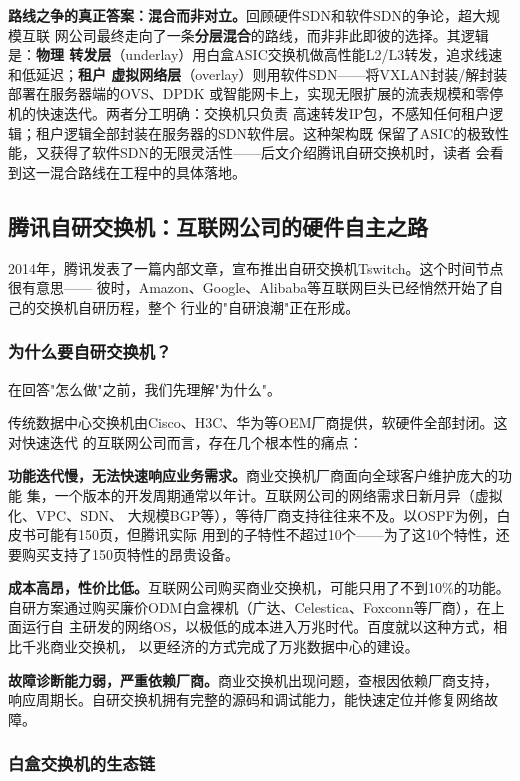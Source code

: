 \textbf{路线之争的真正答案：混合而非对立。}回顾硬件SDN和软件SDN的争论，超大规模互联
网公司最终走向了一条\textbf{分层混合}的路线，而非非此即彼的选择。其逻辑是：\textbf{物理
转发层}（underlay）用白盒ASIC交换机做高性能L2/L3转发，追求线速和低延迟；\textbf{租户
虚拟网络层}（overlay）则用软件SDN——将VXLAN封装/解封装部署在服务器端的OVS、DPDK
或智能网卡上，实现无限扩展的流表规模和零停机的快速迭代。两者分工明确：交换机只负责
高速转发IP包，不感知任何租户逻辑；租户逻辑全部封装在服务器的SDN软件层。这种架构既
保留了ASIC的极致性能，又获得了软件SDN的无限灵活性——后文介绍腾讯自研交换机时，读者
会看到这一混合路线在工程中的具体落地。

\subsection{腾讯自研交换机：互联网公司的硬件自主之路}

2014年，腾讯发表了一篇内部文章，宣布推出自研交换机Tswitch。这个时间节点很有意思——
彼时，Amazon、Google、Alibaba等互联网巨头已经悄然开始了自己的交换机自研历程，整个
行业的"自研浪潮"正在形成。

\subsubsection{为什么要自研交换机？}

在回答"怎么做"之前，我们先理解"为什么"。

传统数据中心交换机由Cisco、H3C、华为等OEM厂商提供，软硬件全部封闭。这对快速迭代
的互联网公司而言，存在几个根本性的痛点：

\textbf{功能迭代慢，无法快速响应业务需求。}商业交换机厂商面向全球客户维护庞大的功能
集，一个版本的开发周期通常以年计。互联网公司的网络需求日新月异（虚拟化、VPC、SDN、
大规模BGP等），等待厂商支持往往来不及。以OSPF为例，白皮书可能有150页，但腾讯实际
用到的子特性不超过10个——为了这10个特性，还要购买支持了150页特性的昂贵设备。

\textbf{成本高昂，性价比低。}互联网公司购买商业交换机，可能只用了不到10\%的功能。
自研方案通过购买廉价ODM白盒裸机（广达、Celestica、Foxconn等厂商），在上面运行自
主研发的网络OS，以极低的成本进入万兆时代。百度就以这种方式，相比千兆商业交换机，
以更经济的方式完成了万兆数据中心的建设。

\textbf{故障诊断能力弱，严重依赖厂商。}商业交换机出现问题，查根因依赖厂商支持，
响应周期长。自研交换机拥有完整的源码和调试能力，能快速定位并修复网络故障。

\subsubsection{白盒交换机的生态链}


